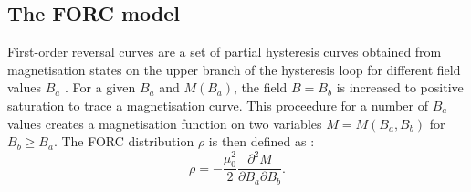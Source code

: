 

\subsection{The FORC model}
First-order reversal curves are a set of partial hysteresis curves obtained from magnetisation states on the upper branch of the hysteresis loop for different field values $B_a$ \citep{Mayergoyz1986}. For a given $B_a$ and $M(B_a)$, the field $B=B_b$ is increased to positive saturation to trace a magnetisation curve. This proceedure for a number of $B_a$ values creates a magnetisation function on two variables $M=M(B_a,B_b)$ for $B_b \geq B_a$. The FORC distribution $\rho$ is then defined as \citep{Roberts2000}:
\begin{equation}\label{forc distribution}
\rho = -\frac{\mu_0^2}{2}\frac{\partial^2 M}{\partial B_a \partial B_b}.
\end{equation}\par

